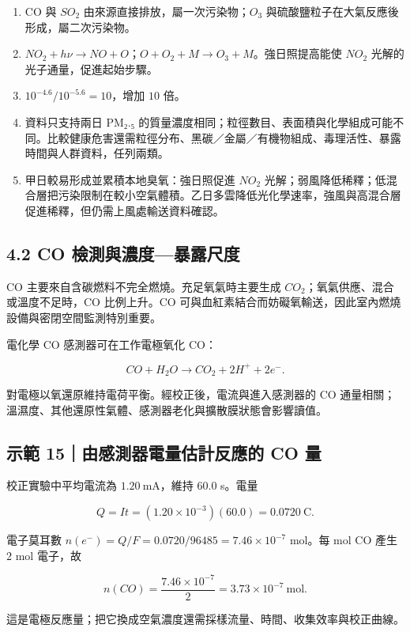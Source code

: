 \documentclass[11pt,a4paper]{article}
\providecommand{\tightlist}{%
  \setlength{\itemsep}{0pt}\setlength{\parskip}{0pt}}
\begin{document}
\begin{enumerate}
\def\labelenumi{\arabic{enumi}.}
\tightlist
\item
  CO 與 \(SO_2\) 由來源直接排放，屬一次污染物；\(O_3\) 與硫酸鹽粒子在大氣反應後形成，屬二次污染物。
\item
  \(NO_2+h\nu\rightarrow NO+O\)；\(O+O_2+M\rightarrow O_3+M\)。強日照提高能使 \(NO_2\) 光解的光子通量，促進起始步驟。
\item
  \(10^{-4.6}/10^{-5.6}=10\)，增加 \(10\) 倍。
\item
  資料只支持兩日 PM₂.₅ 的質量濃度相同；粒徑數目、表面積與化學組成可能不同。比較健康危害還需粒徑分布、黑碳／金屬／有機物組成、毒理活性、暴露時間與人群資料，任列兩類。
\item
  甲日較易形成並累積本地臭氧：強日照促進 \(NO_2\) 光解；弱風降低稀釋；低混合層把污染限制在較小空氣體積。乙日多雲降低光化學速率，強風與高混合層促進稀釋，但仍需上風處輸送資料確認。
\end{enumerate}

\subsection{4.2 CO 檢測與濃度---暴露尺度}\label{co-ux6aa2ux6e2cux8207ux6fc3ux5ea6ux66b4ux9732ux5c3aux5ea6}

CO 主要來自含碳燃料不完全燃燒。充足氧氣時主要生成 \(CO_2\)；氧氣供應、混合或溫度不足時，CO 比例上升。CO 可與血紅素結合而妨礙氧輸送，因此室內燃燒設備與密閉空間監測特別重要。

電化學 CO 感測器可在工作電極氧化 CO：

\[
CO+H_2O\rightarrow CO_2+2H^++2e^-.
\]

對電極以氧還原維持電荷平衡。經校正後，電流與進入感測器的 CO 通量相關；溫濕度、其他還原性氣體、感測器老化與擴散膜狀態會影響讀值。

\begin{HandoutWorkedExample}

\subsection{示範 15｜由感測器電量估計反應的 CO 量}\label{ux793aux7bc4-15ux7531ux611fux6e2cux5668ux96fbux91cfux4f30ux8a08ux53cdux61c9ux7684-co-ux91cf}

校正實驗中平均電流為 \(1.20\ \mathrm{mA}\)，維持 \(60.0\) s。電量

\[
Q=It=(1.20\times10^{-3})(60.0)=0.0720\ \mathrm C.
\]

電子莫耳數 \(n(e^-)=Q/F=0.0720/96485=7.46\times10^{-7}\) mol。每 mol CO 產生 \(2\) mol 電子，故

\[
n(CO)=\frac{7.46\times10^{-7}}{2}=3.73\times10^{-7}\ \mathrm{mol}.
\]

這是電極反應量；把它換成空氣濃度還需採樣流量、時間、收集效率與校正曲線。

\end{HandoutWorkedExample}
\end{document}
